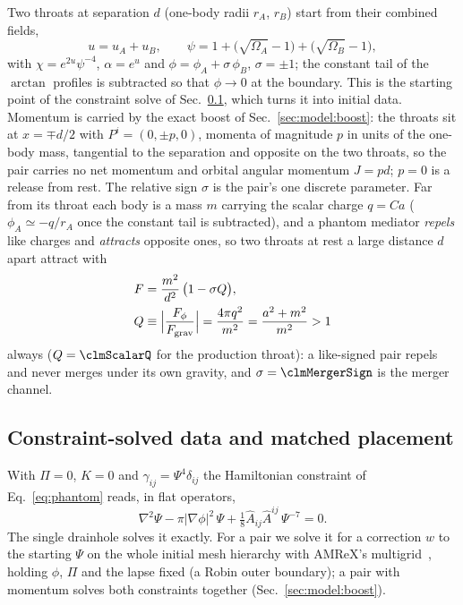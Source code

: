 \documentclass[twocolumn,floatfix,aps,prd,superscriptaddress,nofootinbib]{revtex4-2}
\begin{document}
Two throats at separation $d$ (one-body radii $r_A$, $r_B$) start from their combined fields,
\begin{equation}
u = u_A + u_B,\qquad
\psi = 1 + \bigl(\sqrt{\Omega_A}-1\bigr) + \bigl(\sqrt{\Omega_B}-1\bigr),
\end{equation}
with $\chi = e^{2u}\psi^{-4}$, $\alpha = e^{u}$ and $\phi = \phi_A + \sigma\,\phi_B$, $\sigma=\pm1$; the constant tail of the $\arctan$ profiles is subtracted so that $\phi\to0$ at the boundary. This is the starting point of the constraint solve of Sec.~\ref{sec:model:solve}, which turns it into initial data. Momentum is carried by the exact boost of Sec.~\ref{sec:model:boost}: the throats sit at $x=\mp d/2$ with $P^i=(0,\pm p,0)$, momenta of magnitude $p$ in units of the one-body mass, tangential to the separation and opposite on the two throats, so the pair carries no net momentum and orbital angular momentum $J=pd$; $p=0$ is a release from rest. The relative sign $\sigma$ is the pair's one discrete parameter. Far from its throat each body is a mass $m$ carrying the scalar charge $q=Ca$ ($\phi_A\simeq-q/r_A$ once the constant tail is subtracted), and a phantom mediator \emph{repels} like charges and \emph{attracts} opposite ones, so two throats at rest a large distance $d$ apart attract with
\begin{equation}
\begin{split}
F&=\frac{m^2}{d^2}\,\bigl(1-\sigma Q\bigr),\\
Q&\equiv\Bigl|\frac{F_\phi}{F_{\rm grav}}\Bigr|=\frac{4\pi q^2}{m^2}=\frac{a^2+m^2}{m^2}>1
\end{split}
\label{eq:force}
\end{equation}
always ($Q=\clmScalarQ$ for the production throat): a like-signed pair repels and never merges under its own gravity, and $\sigma=\clmMergerSign$ is the merger channel.

\subsection{Constraint-solved data and matched placement}
\label{sec:model:solve}

With $\Pi=0$, $K=0$ and $\gamma_{ij}=\Psi^4\delta_{ij}$ the Hamiltonian constraint of Eq.~\eqref{eq:phantom} reads, in flat operators,
\begin{equation}
\nabla^2\Psi-\pi|\nabla\phi|^2\,\Psi+\tfrac18\hat A_{ij}\hat A^{ij}\,\Psi^{-7}=0 .
\label{eq:hamsolve}
\end{equation}
The single drainhole solves it exactly. For a pair we solve it for a correction $w$ to the starting $\Psi$ on the whole initial mesh hierarchy with AMReX's multigrid~\cite{amrex}, holding $\phi$, $\Pi$ and the lapse fixed (a Robin outer boundary); a pair with momentum solves both constraints together (Sec.~\ref{sec:model:boost}).
\end{document}
